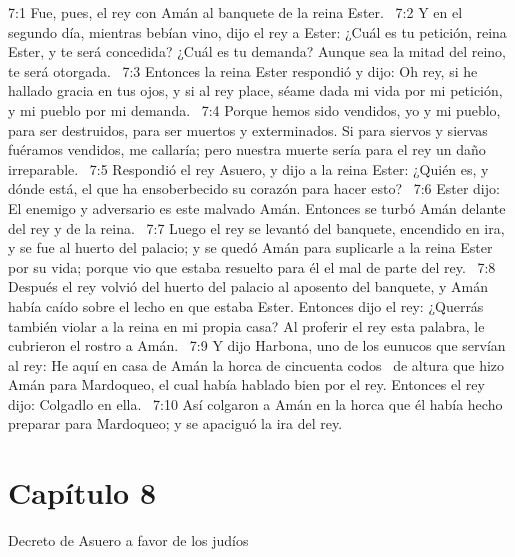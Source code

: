 7:1 Fue, pues, el rey con Amán al banquete de la reina Ester.  
7:2 Y en el segundo día, mientras bebían vino, dijo el rey a Ester: ¿Cuál es tu petición, reina Ester, y te será concedida? ¿Cuál es tu demanda? Aunque sea la mitad del reino, te será otorgada.  
7:3 Entonces la reina Ester respondió y dijo: Oh rey, si he hallado gracia en tus ojos, y si al rey place, séame dada mi vida por mi petición, y mi pueblo por mi demanda.  
7:4 Porque hemos sido vendidos, yo y mi pueblo, para ser destruidos, para ser muertos y exterminados. Si para siervos y siervas fuéramos vendidos, me callaría; pero nuestra muerte sería para el rey un daño irreparable.  
7:5 Respondió el rey Asuero, y dijo a la reina Ester: ¿Quién es, y dónde está, el que ha ensoberbecido su corazón para hacer esto?  
7:6 Ester dijo: El enemigo y adversario es este malvado Amán. Entonces se turbó Amán delante del rey y de la reina.  
7:7 Luego el rey se levantó del banquete, encendido en ira, y se fue al huerto del palacio; y se quedó Amán para suplicarle a la reina Ester por su vida; porque vio que estaba resuelto para él el mal de parte del rey.  
7:8 Después el rey volvió del huerto del palacio al aposento del banquete, y Amán había caído sobre el lecho en que estaba Ester. Entonces dijo el rey: ¿Querrás también violar a la reina en mi propia casa? Al proferir el rey esta palabra, le cubrieron el rostro a Amán.  
7:9 Y dijo Harbona, uno de los eunucos que servían al rey: He aquí en casa de Amán la horca de cincuenta codos  de altura que hizo Amán para Mardoqueo, el cual había hablado bien por el rey. Entonces el rey dijo: Colgadlo en ella.  
7:10 Así colgaron a Amán en la horca que él había hecho preparar para Mardoqueo; y se apaciguó la ira del rey.  
\section*{Capítulo 8}
Decreto de Asuero a favor de los judíos 

